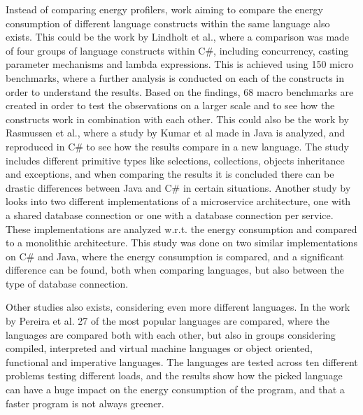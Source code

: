 Instead of comparing energy profilers, work aiming to compare the energy consumption of different language constructs within the same language also exists. This could be the work by Lindholt et al.\cite[]{Lindholt2022}, where a comparison was made of four groups of language constructs within C\#, including concurrency, casting parameter mechanisms and lambda expressions. This is achieved using 150 micro benchmarks, where a further analysis is conducted on each of the constructs in order to understand the results. Based on the findings, 68 macro benchmarks are created in order to test the observations on a larger scale and to see how the constructs work in combination with each other. This could also be the work by Rasmussen et al.\cite[]{Rasmussen2021}, where a study by Kumar et al\cite[]{Kumar2017} made in Java is analyzed, and reproduced in C\# to see how the results compare in a new language. The study includes different primitive types like selections, collections, objects inheritance and exceptions, and when comparing the results it is concluded there can be drastic differences between Java and C\# in certain situations. Another study by \cite[]{Theilmann2022} looks into two different implementations of a microservice architecture, one with a shared database connection or one with a database connection per service. These implementations are analyzed w.r.t. the energy consumption and compared to a monolithic architecture. This study was done on two similar implementations on C\# and Java, where the energy consumption is compared, and a significant difference can be found, both when comparing languages, but also between the type of database connection.

Other studies also exists, considering even more different languages. In the work by Pereira et al.\cite[]{Pereira2017} 27 of the most popular languages are compared, where the languages are compared both with each other, but also in groups considering compiled, interpreted and virtual machine languages or object oriented, functional and imperative languages. The languages are tested across ten different problems testing different loads, and the results show how the picked language can have a huge impact on the energy consumption of the program, and that a faster program is not always greener.

